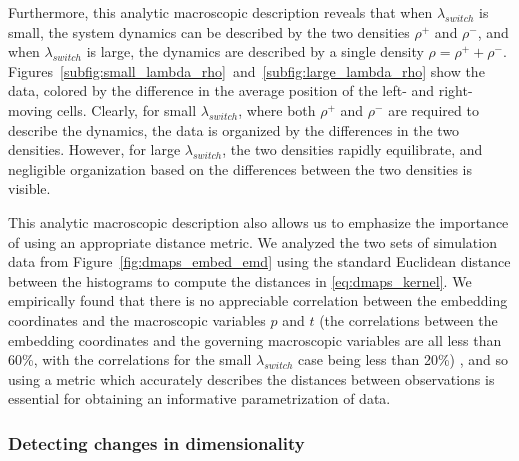 Furthermore, this analytic macroscopic description reveals that when $\lambda_{switch}$ is small, the system dynamics can be described by the two densities $\rho^+$ and $\rho^-$, and when $\lambda_{switch}$ is large, the dynamics are described by a single density $\rho = \rho^+ + \rho^-$.
%
Figures~\ref{subfig:small_lambda_rho}~and~\ref{subfig:large_lambda_rho} show the data, colored by the difference in the average position of the left- and right-moving cells.
%
Clearly, for small $\lambda_{switch}$, where both $\rho^+$ and $\rho^-$ are required to describe the dynamics, the data is organized by the differences in the two densities.
%
However, for large $\lambda_{switch}$, the two densities rapidly equilibrate, and negligible organization based on the differences between the two densities is visible.


This analytic macroscopic description also allows us to emphasize the importance of using an appropriate distance metric.
%
We analyzed the two sets of simulation data from Figure~\ref{fig:dmaps_embed_emd} using the standard Euclidean distance between the histograms to compute the distances in \eqref{eq:dmaps_kernel}.
%
We empirically found that there is no appreciable correlation between the embedding coordinates and the macroscopic variables $p$ and $t$ (the correlations between the embedding coordinates and the governing macroscopic variables are all less than 60\%, with the correlations for the small $\lambda_{switch}$ case being less than 20\%)
%
, and so using a metric which accurately describes the distances between observations is essential for obtaining an informative parametrization of data.

\subsubsection{Detecting changes in dimensionality}

